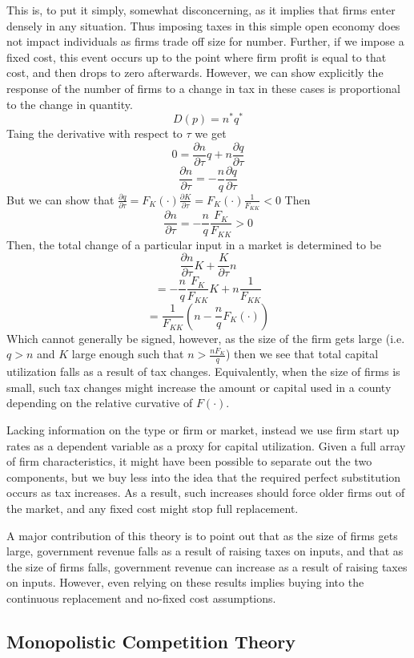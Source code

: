 \documentclass{article}
\begin{document}
This is, to put it simply, somewhat disconcerning, as it implies that firms enter densely in any situation. Thus imposing taxes in this simple open economy does not impact individuals as firms trade off size for number. Further, if we impose a fixed cost, this event occurs up to the point where firm profit is equal to that cost, and then drops to zero afterwards. However, we can show explicitly the response of the number of firms to a change in tax in these cases is proportional to the change in quantity. 
$$D(p) = n^{*}q^{*}$$
Taing the derivative with respect to $\tau$ we get
$$0 = \frac{\partial n}{\partial \tau}q+ n\frac{\partial q}{\partial \tau}$$
$$\frac{\partial n}{\partial \tau} = -\frac{n}{q}\frac{\partial q}{\partial \tau}$$
But we can show that $\frac{\partial q}{\partial \tau} = F_{K}(\cdot)\frac{\partial K}{\partial \tau} =  F_{K}(\cdot)\frac{1}{F_{KK}} < 0$
Then
$$\frac{\partial n}{\partial \tau} = -\frac{n}{q}\frac{F_{K}}{F_{KK}} > 0$$
Then, the total change of a particular input in a market is determined to be
$$\frac{\partial n}{\partial \tau}K+\frac{K}{\partial \tau}n$$
$$= -\frac{n}{q}\frac{F_{K}}{F_{KK}}K+n\frac{1}{F_{KK}}$$
$$=\frac{1}{F_{KK}}(n-\frac{n}{q}F_{K}(\cdot))$$
Which cannot generally be signed, however, as the size of the firm gets large (i.e. $q > n$ and $K$ large enough such that $n > \frac{nF_{K}}{q}$) then we see that total capital utilization falls as a result of tax changes. Equivalently, when the size of firms is small, such tax changes might increase the amount or capital used in a county depending on the relative curvative of $F(\cdot)$.

Lacking information on the type or firm or market, instead we use firm start up rates as a dependent variable as a proxy for capital utilization. Given a full array of firm characteristics, it might have been possible to separate out the two components, but we buy less into the idea that the required perfect substitution occurs as tax increases. As a result, such increases should force older firms out of the market, and any fixed cost might stop full replacement.

A major contribution of this theory is to point out that as the size of firms gets large, government revenue falls as a result of raising taxes on inputs, and that as the size of firms falls, government revenue can increase as a result of raising taxes on inputs. However, even relying on these results implies buying into the continuous replacement and no-fixed cost assumptions.


\subsection{Monopolistic Competition Theory}
\end{document}
